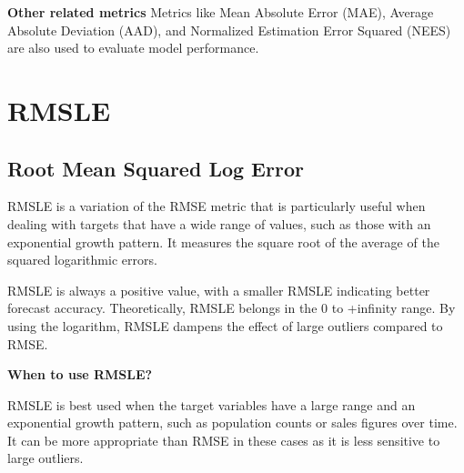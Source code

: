 \vspace{10pt} %

\textbf{Other related metrics}
Metrics like Mean Absolute Error (MAE), Average Absolute Deviation (AAD), and Normalized Estimation Error Squared (NEES) are also used to evaluate model performance.

\clearpage
\thispagestyle{regressionstyle}
\section{RMSLE}
\subsection{Root Mean Squared Log Error}

RMSLE is a variation of the RMSE metric that is particularly useful when dealing with targets that have a wide range of values, such as those with an exponential growth pattern.
It measures the square root of the average of the squared logarithmic errors.

\begin{center}
\end{center}

RMSLE is always a positive value, with a smaller RMSLE indicating better forecast accuracy. Theoretically, RMSLE belongs in the 0 to +infinity range.
By using the logarithm, RMSLE dampens the effect of large outliers compared to RMSE.

\textbf{When to use RMSLE?}

RMSLE is best used when the target variables have a large range and an exponential growth pattern, such as population counts or sales figures over time.
It can be more appropriate than RMSE in these cases as it is less sensitive to large outliers.

